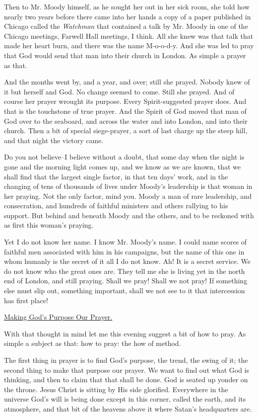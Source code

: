Then to Mr. Moody himself, as he sought her out in her sick room, she told
how nearly two years before there came into her hands a copy of a paper
published in Chicago called the \textit{Watchman} that contained a talk by Mr.
Moody in one of the Chicago meetings, Farwell Hall meetings, I think. All
she knew was that talk that made her heart burn, and there was the name
M-o-o-d-y. And she was led to pray that God would send that man into their
church in London. As simple a prayer as that.

And the months went by, and a year, and over; still she prayed. Nobody
knew of it but herself and God. No change seemed to come. Still she
prayed. And of course her prayer wrought its purpose. Every
Spirit-suggested prayer does. And that is the touchstone of true prayer.
And the Spirit of God moved that man of God over to the seaboard, and
across the water and into London, and into their church. Then a bit of
special siege-prayer, a sort of last charge up the steep hill, and that
night the victory came.

Do you not believe--I believe without a doubt, that some day when the
night is gone and the morning light comes up, and we know as we are known,
that we shall find that the largest single factor, in that ten days' work,
and in the changing of tens of thousands of lives under Moody's leadership
is that woman in her praying. Not the only factor, mind you. Moody a man
of rare leadership, and consecration, and hundreds of faithful ministers
and others rallying to his support. But behind and beneath Moody and the
others, and to be reckoned with as first this woman's praying.

Yet I do not know her name. I know Mr. Moody's name. I could name scores
of faithful men associated with him in his campaigns, but the name of this
one in whom humanly is the secret of it all I do not know. Ah! It is a
secret service. We do not know who the great ones are. They tell me she is
living yet in the north end of London, and still praying. Shall we pray!
Shall we not pray! If something else must slip out, something important,
shall we not see to it that intercession has first place!



\underline{Making God's Purpose Our Prayer.}


With that thought in mind let me this evening suggest a bit of how to
pray. As simple a subject as that: how to pray: the how of method.

The first thing in prayer is to find God's purpose, the trend, the swing
of it; the second thing to make that purpose our prayer. We want to find
out what God is thinking, and then to claim that that shall be done. God
is seated up yonder on the throne. Jesus Christ is sitting by His side
glorified. Everywhere in the universe God's will is being done except in
this corner, called the earth, and its atmosphere, and that bit of the
heavens above it where Satan's headquarters are.

